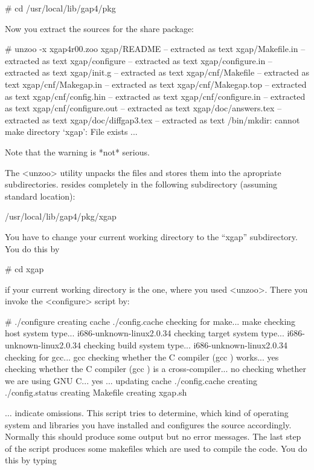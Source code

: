 \begintt
# cd /usr/local/lib/gap4/pkg
\endtt

Now you extract the sources for the {\XGAP} share package:

\begintt
# unzoo -x xgap4r00.zoo
xgap/README     -- extracted as text
xgap/Makefile.in        -- extracted as text
xgap/configure  -- extracted as text
xgap/configure.in       -- extracted as text
xgap/init.g     -- extracted as text
xgap/cnf/Makefile       -- extracted as text
xgap/cnf/Makegap.in     -- extracted as text
xgap/cnf/Makegap.top    -- extracted as text
xgap/cnf/config.hin     -- extracted as text
xgap/cnf/configure.in   -- extracted as text
xgap/cnf/configure.out  -- extracted as text
xgap/doc/answers.tex    -- extracted as text
xgap/doc/diffgap3.tex   -- extracted as text
/bin/mkdir: cannot make directory `xgap': File exists
...
\endtt

Note that the warning is *not* serious.

The <unzoo> utility unpacks the files and stores them into the apropriate
subdirectories. {\XGAP} resides completely in the following subdirectory
(assuming standard location):

\begintt
/usr/local/lib/gap4/pkg/xgap
\endtt


You have to change your current working directory to the ``xgap''
subdirectory. You do this by

\begintt
# cd xgap
\endtt

if your current working directory is the one, where you used
<unzoo>. There you invoke the <configure> script by:

\begintt
# ./configure
creating cache ./config.cache
checking for make... make
checking host system type... i686-unknown-linux2.0.34
checking target system type... i686-unknown-linux2.0.34
checking build system type... i686-unknown-linux2.0.34
checking for gcc... gcc
checking whether the C compiler (gcc  ) works... yes
checking whether the C compiler (gcc  ) is a cross-compiler... no
checking whether we are using GNU C... yes
...
updating cache ./config.cache
creating ./config.status
creating Makefile
creating xgap.sh
\endtt

$\ldots$ indicate omissions. 
This script tries to determine, which kind of operating system and
libraries you have installed and configures the source
accordingly. Normally this should produce some output but no error
messages. The last step of the script produces some makefiles which are
used to compile the code. You do this by typing

